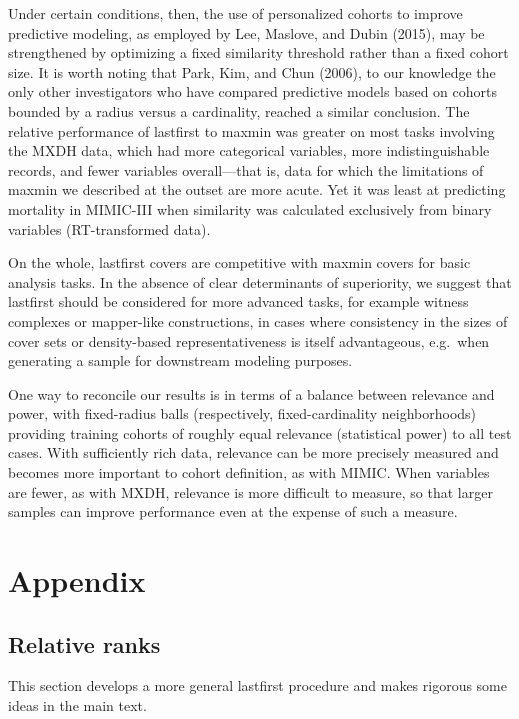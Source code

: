 \documentclass{article}
\begin{document}
Under certain conditions, then, the use of personalized cohorts to
improve predictive modeling, as employed by Lee, Maslove, and Dubin
(2015), may be strengthened by optimizing a fixed similarity threshold
rather than a fixed cohort size. It is worth noting that Park, Kim, and
Chun (2006), to our knowledge the only other investigators who have
compared predictive models based on cohorts bounded by a radius versus a
cardinality, reached a similar conclusion. The relative performance of
lastfirst to maxmin was greater on most tasks involving the MXDH data,
which had more categorical variables, more indistinguishable records,
and fewer variables overall---that is, data for which the limitations of
maxmin we described at the outset are more acute. Yet it was least at
predicting mortality in MIMIC-III when similarity was calculated
exclusively from binary variables (RT-transformed data).

On the whole, lastfirst covers are competitive with maxmin covers for
basic analysis tasks. In the absence of clear determinants of
superiority, we suggest that lastfirst should be considered for more
advanced tasks, for example witness complexes or mapper-like
constructions, in cases where consistency in the sizes of cover sets or
density-based representativeness is itself advantageous, e.g.~when
generating a sample for downstream modeling purposes.

One way to reconcile our results is in terms of a balance between
relevance and power, with fixed-radius balls (respectively,
fixed-cardinality neighborhoods) providing training cohorts of roughly
equal relevance (statistical power) to all test cases. With sufficiently
rich data, relevance can be more precisely measured and becomes more
important to cohort definition, as with MIMIC. When variables are fewer,
as with MXDH, relevance is more difficult to measure, so that larger
samples can improve performance even at the expense of such a measure.

\hypertarget{appendix}{%
\section{Appendix}\label{appendix}}

\hypertarget{relative-ranks}{%
\subsection{Relative ranks}\label{relative-ranks}}

This section develops a more general lastfirst procedure and makes
rigorous some ideas in the main text.
\end{document}
